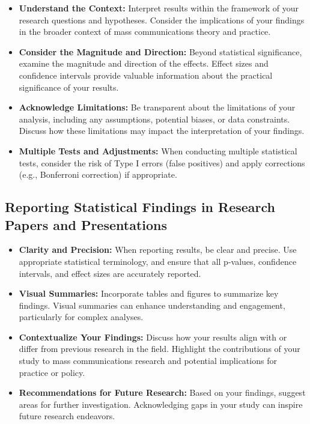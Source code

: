 \documentclass[
]{book}
\begin{document}
\begin{itemize}
\item
  \textbf{Understand the Context:} Interpret results within the framework of your research questions and hypotheses. Consider the implications of your findings in the broader context of mass communications theory and practice.
\item
  \textbf{Consider the Magnitude and Direction:} Beyond statistical significance, examine the magnitude and direction of the effects. Effect sizes and confidence intervals provide valuable information about the practical significance of your results.
\item
  \textbf{Acknowledge Limitations:} Be transparent about the limitations of your analysis, including any assumptions, potential biases, or data constraints. Discuss how these limitations may impact the interpretation of your findings.
\item
  \textbf{Multiple Tests and Adjustments:} When conducting multiple statistical tests, consider the risk of Type I errors (false positives) and apply corrections (e.g., Bonferroni correction) if appropriate.
\end{itemize}

\subsection*{Reporting Statistical Findings in Research Papers and Presentations}\label{reporting-statistical-findings-in-research-papers-and-presentations}

\begin{itemize}
\item
  \textbf{Clarity and Precision:} When reporting results, be clear and precise. Use appropriate statistical terminology, and ensure that all p-values, confidence intervals, and effect sizes are accurately reported.
\item
  \textbf{Visual Summaries:} Incorporate tables and figures to summarize key findings. Visual summaries can enhance understanding and engagement, particularly for complex analyses.
\item
  \textbf{Contextualize Your Findings:} Discuss how your results align with or differ from previous research in the field. Highlight the contributions of your study to mass communications research and potential implications for practice or policy.
\item
  \textbf{Recommendations for Future Research:} Based on your findings, suggest areas for further investigation. Acknowledging gaps in your study can inspire future research endeavors.
\end{itemize}
\end{document}
